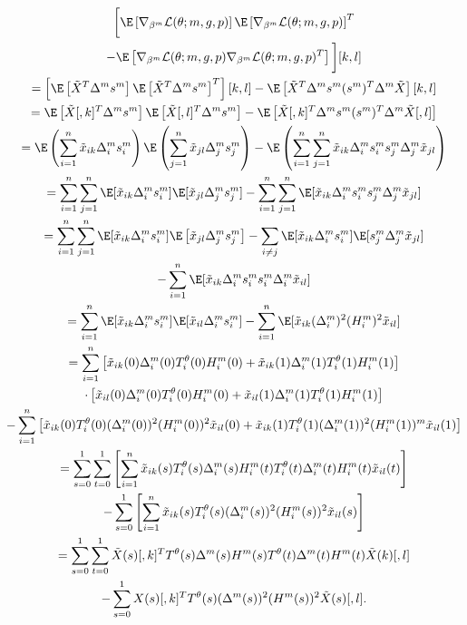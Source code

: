\documentclass[11pt]{article}
\begin{document}
\begin{appendices}
\begin{refsection}
\begin{multline*}
\bigg[ \E \left[ \nabla_{\beta^m} \mathcal{L}(\theta; m, g, p) \right] \E \left[ \nabla_{\beta^m} \mathcal{L}(\theta; m, g, p) \right]^T \\ - \E \left[\nabla_{\beta^m} \mathcal{L}(\theta; m, g, p) \nabla_{\beta^m} \mathcal{L}(\theta; m, g, p)^T \right] \bigg] [k,l] \\ 
= \left[ \E \left[\tilde{X}^T \Delta^m s^m \right] \E \left[\tilde{X}^T \Delta^m s^m \right]^T\right][k,l] - \E \left[\tilde{X}^T \Delta^m s^m (s^m)^T \Delta^m \tilde{X} \right][k,l] \\
= \E\left[ \tilde{X}[,k]^T \Delta^m s^m \right] \E \left[ \tilde{X}[,l]^T \Delta^m s^m \right] - \E \left[ \tilde{X}[,k]^T \Delta^m s^m (s^m)^T \Delta^m \tilde{X}[,l ] \right] \\ 
=\E\left(\sum_{i=1}^n \tilde{x}_{ik} \Delta^m_i s^m_{i} \right) \E \left( \sum_{j=1}^n \tilde{x}_{jl} \Delta^m_j s^m_j \right) - \E \left( \sum_{i=1}^n \sum_{j=1}^n \tilde{x}_{ik} \Delta^m_i s^m_i s^m_j \Delta^m_j \tilde{x}_{jl} \right) \\
= \sum_{i=1}^n \sum_{j=1}^n \E[ \tilde{x}_{ik} \Delta^m_is^m_i] \E [\tilde{x}_{jl} \Delta^m_j s^m_j]  -  \sum_{i=1}^n \sum_{j=1}^n \E [ \tilde{x}_{ik} \Delta^m_i s^m_i s^m_j \Delta^m_j \tilde{x}_{jl}] \\
= \sum_{i=1}^n \sum_{j=1}^n \E[ \tilde{x}_{ik} \Delta^m_i s^m_i] \E \left[\tilde{x}_{jl} \Delta^m_j s^m_j \right]  - \sum_{i \neq j} \E [ \tilde{x}_{ik} \Delta^m_i s^m_i] \E[s^m_j \Delta^m_j \tilde{x}_{jl}] \\ - \sum_{i=1}^n \E[\tilde{x}_{ik} \Delta^m_i s^m_i s^m_i \Delta^m_i \tilde{x}_{il}] \\ 
= \sum_{i=1}^n \E[\tilde{x}_{ik} \Delta^m_i s^m_i ] \E [ \tilde{x}_{il} \Delta^m_i s^m_i] - \sum_{i=1}^n \E[\tilde{x}_{ik} (\Delta_i^m)^2 (H_i^m)^2 \tilde{x}_{il}] \\ = \sum_{i=1}^n \left[\tilde{x}_{ik}(0) {\Delta}^m_i(0) T_i^{\theta}(0) {H}^m_i(0) + \tilde{x}_{ik}(1) {\Delta}^m_i(1) T_i^{\theta}(1) {H}^m_i(1) \right] \\ \cdot \left[ \tilde{x}_{il}(0) {\Delta}^m_i(0) T_i^{\theta}(0) {H}^m_i(0) + \tilde{x}_{il}(1) {\Delta}^m_i(1) T_i^{\theta}(1) {H}^m_i(1) \right] \\ - \sum_{i=1}^n \left[ \tilde{x}_{ik}(0) T_i^{\theta}(0) (\Delta_i^m(0))^2 ({H}_i^m(0))^2 \tilde{x}_{il}(0)  + \tilde{x}_{ik}(1) T_i^{\theta}(1) ({\Delta}^m_i(1))^2 ({H}_i^m(1))^m \tilde{x}_{il}(1) \right] \\ = \sum_{s=0}^1 \sum_{t=0}^1 \left[ \sum_{i=1}^n \tilde{x}_{ik}(s) T^{\theta}_i(s) {\Delta}^m_i(s) {H}^m_i(t) T_i^{\theta}(t){\Delta}^m_i(t) {H}^m_i(t) \tilde{x}_{il}(t) \right] \\ - \sum_{s=0}^1 \left[\sum_{i=1}^n \tilde{x}_{ik}(s) T_i^\theta(s) ({\Delta}^m_i(s))^2 ({H}_i^m(s))^2 \tilde{x}_{il}(s) \right] \\ = \sum_{s=0}^1 \sum_{t=0}^1 \tilde{X}(s)[,k]^T {T}^\theta(s) {\Delta}^m(s) {H}^m(s) {T}^\theta(t) {\Delta}^m(t) {H}^m(t) \tilde{X}(k)[,l] \\ - \sum_{s=0}^1{X}(s)[,k]^T {T}^\theta(s) ({\Delta}^m(s))^2 ({H}^m(s))^2 \tilde{X}(s)[,l].

\end{multline*}
\end{refsection}
\end{appendices}
\end{document}
